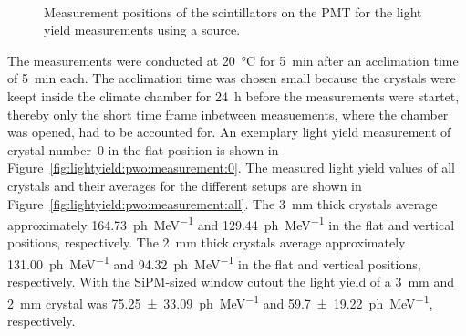 \begin{figure}[h]
    \centering        
    \hspace{0.02\textwidth}
    \\ 
    \caption{Measurement positions of the  scintillators on the \gls{PMT} for the light yield measurements using a  source.}\label{fig:lightyield:pwo:setup}
\end{figure}


The measurements were conducted at \SI{20}{\celsius} for \SI{5}{\minute} after an acclimation time of \SI{5}{\minute} each.
The acclimation time was chosen small because the crystals were keept inside the climate chamber for \SI{24}{\hour} before the measurements were startet, thereby only the short time frame inbetween measuements, where the chamber was opened, had to be accounted for.
An exemplary light yield measurement of crystal number~0 in the flat position is shown in Figure~\ref{fig:lightyield:pwo:measurement:0}.
The measured light yield values of all crystals and their averages for the different setups are shown in Figure~\ref{fig:lightyield:pwo:measurement:all}.
The \SI{3}{\milli\meter} thick crystals average approximately \SI{164.73}{ph\per\mega\electronvolt} and \SI{129.44}{ph\per\mega\electronvolt} in the flat and vertical positions, respectively.
The \SI{2}{\milli\meter} thick crystals average approximately \SI{131.00}{ph\per\mega\electronvolt} and \SI{94.32}{ph\per\mega\electronvolt} in the flat and vertical positions, respectively.
With the SiPM-sized window cutout the light yield of a \SI{3}{\milli\meter} and \SI{2}{\milli\meter} crystal was \SI{75.25\pm 33.09}{ph\per\mega\electronvolt} and \SI{59.7\pm 19.22}{ph\per\mega\electronvolt}, respectively.

